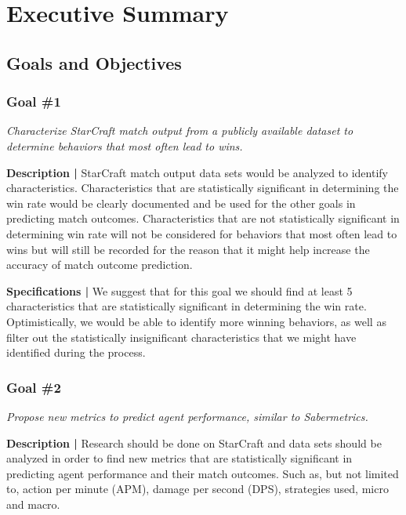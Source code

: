 \documentclass[a4paper,12pt]{report}
\begin{document}

\tableofcontents

\newpage

\setlength{\parskip}{\baselineskip}
\setlength{\parindent}{0in}

\chapter{Executive Summary}
\section{Goals and Objectives}
\subsection{Goal \#1}

\textit{Characterize StarCraft match output from a publicly available dataset to determine behaviors that most often lead to wins.}

\textbf{Description |} StarCraft match output data sets would be analyzed to identify characteristics. Characteristics that are statistically significant in determining the win rate would be clearly documented and be used for the other goals in predicting match outcomes. Characteristics that are not statistically significant in determining win rate will not be considered for behaviors that most often lead to wins but will still be recorded for the reason that it might help increase the accuracy of match outcome prediction.

\textbf{Specifications |} We suggest that for this goal we should find at least 5 characteristics that are statistically significant in determining the win rate. Optimistically, we would be able to identify more winning behaviors, as well as filter out the statistically insignificant characteristics that we might have identified during the process. 

\subsection{Goal \#2}

\textit{Propose new metrics to predict agent performance, similar to Sabermetrics.}

\textbf{Description |} Research should be done on StarCraft and data sets should be analyzed in order to find new metrics that are statistically significant in predicting agent performance and their match outcomes. Such as, but not limited to, action per minute (APM), damage per second (DPS), strategies used, micro and macro.
\end{document}
